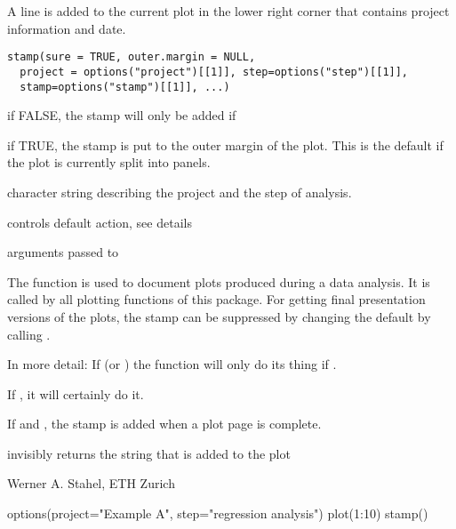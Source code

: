 \documentclass{article}
\begin{document}
\begin{Description}\relax
A line is added to the current plot in the lower right corner
that contains project information and date.
\end{Description}
\begin{Usage}
\begin{verbatim}
stamp(sure = TRUE, outer.margin = NULL,
  project = options("project")[[1]], step=options("step")[[1]],
  stamp=options("stamp")[[1]], ...)
\end{verbatim}
\end{Usage}
\begin{Arguments}
\begin{ldescription}
\item[\code{sure}] if FALSE, the stamp will only be added if
\item[\code{outer.margin}] if TRUE, the stamp is put to the outer margin of
the plot. This is the default if the plot is currently split into panels.
\item[\code{project, step}] character string describing the project and the step of
analysis.
\item[\code{stamp}] controls default action, see details 
\item[\code{...}] arguments passed to 
\end{ldescription}
\end{Arguments}
\begin{Details}\relax
The function is used to document plots produced during a data
analysis. It is called by all plotting functions of this package.
For getting final presentation versions of the plots, the stamp can be
suppressed by changing the default by calling .

In more detail:  If  (or )
the function will only do its thing if .

If , it will certainly do it.

If  and , the stamp is added when a
plot page is complete.
\end{Details}
\begin{Value}
invisibly returns the string that is added to the plot
\end{Value}
\begin{Author}\relax
Werner A. Stahel, ETH Zurich
\end{Author}
\begin{Examples}
\begin{ExampleCode}
options(project="Example A",  step="regression analysis")
plot(1:10)
stamp()
\end{ExampleCode}
\end{Examples}
\end{document}
